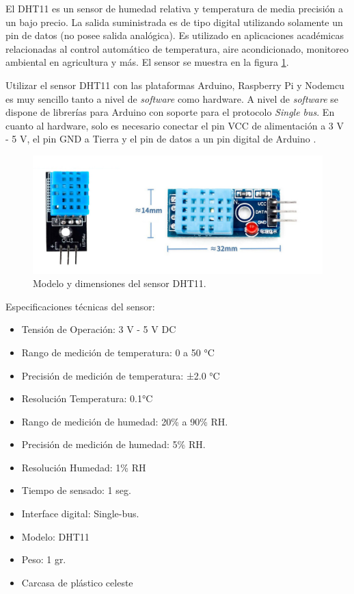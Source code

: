 El DHT11 es un sensor de humedad relativa y temperatura de media precisión a un bajo precio. La salida suministrada es de tipo digital utilizando solamente un pin de datos (no posee salida analógica). Es utilizado en aplicaciones académicas relacionadas al control automático de temperatura, aire acondicionado, monitoreo ambiental en agricultura y más. El sensor se muestra en la figura \ref{fig:dht11}.

Utilizar el sensor DHT11 con las plataformas Arduino, Raspberry Pi y Nodemcu es muy sencillo tanto a nivel de \emph{software} como hardware. A nivel de \emph{software} se dispone de librerías para Arduino con soporte para el protocolo \emph{Single bus}. En cuanto al hardware, solo es necesario conectar el pin VCC de alimentación a 3 V - 5 V, el pin GND a Tierra y el pin de datos a un pin digital de Arduino \citep{WEBSITE:8}. 

\begin{figure}[htbp]
	\centering
	\includegraphics[width=.8\textwidth]{./Figures/dht11.jpg}
	\caption{Modelo y dimensiones del sensor DHT11. }

	\label{fig:dht11}
\end{figure}

Especificaciones técnicas del sensor:

\begin{itemize}
\item Tensión de Operación: 3 V - 5 V DC
\item Rango de medición de temperatura: 0 a 50 °C
\item Precisión de medición de temperatura: ±2.0 °C
\item Resolución Temperatura: 0.1°C
\item Rango de medición de humedad: 20\% a 90\% RH.
\item Precisión de medición de humedad: 5\% RH.
\item Resolución Humedad: 1\% RH
\item Tiempo de sensado: 1 seg.
\item Interface digital: Single-bus.
\item Modelo: DHT11
\item Peso: 1 gr.
\item Carcasa de plástico celeste
\end{itemize}

